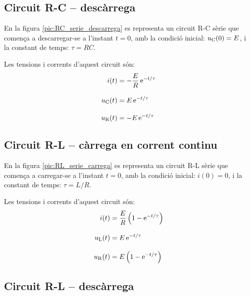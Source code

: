 \subsection{Circuit R-C -- desc\`{a}rrega}

En la figura \vref{pic:RC_serie_descarrega} es representa un circuit R-C s\`{e}rie que comen\c{c}a a descarregar-se a l'instant $t=0$, amb la condici\'{o} inicial: $u_\mathrm{C}(0) = E$, i la constant de temps: $\tau = R C$.
\begin{center}
    
    \label{pic:RC_serie_descarrega}
\end{center}

Les tensions i corrents d'aquest circuit s\'{o}n:
\begin{align}
    i(t) &= - \frac{E}{R}\,\mathrm{e}^{-t/\tau} \\[3mm]
    u_\mathrm{C}(t) &= E\,\mathrm{e}^{-t/\tau} \\[3mm]
    u_\mathrm{R}(t) &= - E\,\mathrm{e}^{-t/\tau}
\end{align}

\subsection{Circuit R-L -- c\`{a}rrega en corrent continu}

En la figura \vref{pic:RL_serie_carrega} es representa un circuit R-L s\`{e}rie que comen\c{c}a a carregar-se a l'instant $t=0$, amb la condici\'{o} inicial: $i(0) = 0$, i la constant de temps: $\tau = L/R$.
\begin{center}
    
    \label{pic:RL_serie_carrega}
\end{center}

Les tensions i corrents d'aquest circuit s\'{o}n:
\begin{align}
    i(t) &= \frac{E}{R}\left( 1 - \mathrm{e}^{-t/\tau} \right)\\[3mm]
    u_\mathrm{L}(t) &= E\,\mathrm{e}^{-t/\tau} \\[3mm]
    u_\mathrm{R}(t) &= E\left( 1 - \mathrm{e}^{-t/\tau} \right)
\end{align}

\subsection{Circuit R-L -- desc\`{a}rrega}

